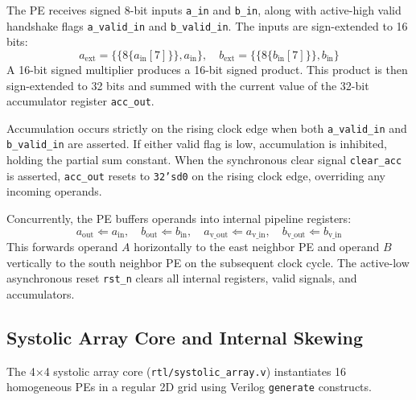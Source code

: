 \documentclass[conference]{IEEEtran}
\begin{document}
The PE receives signed 8-bit inputs \texttt{a\_in} and \texttt{b\_in}, along with active-high valid handshake flags \texttt{a\_valid\_in} and \texttt{b\_valid\_in}. The inputs are sign-extended to 16 bits:
\begin{equation}
a_{\text{ext}} = \{\{8\{a_{\text{in}}[7]\}\}, a_{\text{in}}\}, \quad b_{\text{ext}} = \{\{8\{b_{\text{in}}[7]\}\}, b_{\text{in}}\}
\end{equation}
A 16-bit signed multiplier produces a 16-bit signed product. This product is then sign-extended to 32 bits and summed with the current value of the 32-bit accumulator register \texttt{acc\_out}.

Accumulation occurs strictly on the rising clock edge when both \texttt{a\_valid\_in} and \texttt{b\_valid\_in} are asserted. If either valid flag is low, accumulation is inhibited, holding the partial sum constant. When the synchronous clear signal \texttt{clear\_acc} is asserted, \texttt{acc\_out} resets to \texttt{32'sd0} on the rising clock edge, overriding any incoming operands.

Concurrently, the PE buffers operands into internal pipeline registers:
\begin{equation}
a_{\text{out}} \Leftarrow a_{\text{in}}, \quad b_{\text{out}} \Leftarrow b_{\text{in}}, \quad a_{\text{v\_out}} \Leftarrow a_{\text{v\_in}}, \quad b_{\text{v\_out}} \Leftarrow b_{\text{v\_in}}
\end{equation}
This forwards operand $A$ horizontally to the east neighbor PE and operand $B$ vertically to the south neighbor PE on the subsequent clock cycle. The active-low asynchronous reset \texttt{rst\_n} clears all internal registers, valid signals, and accumulators.

\subsection{Systolic Array Core and Internal Skewing}
The 4$\times$4 systolic array core (\texttt{rtl/systolic\_array.v}) instantiates 16 homogeneous PEs in a regular 2D grid using Verilog \texttt{generate} constructs.
\end{document}
